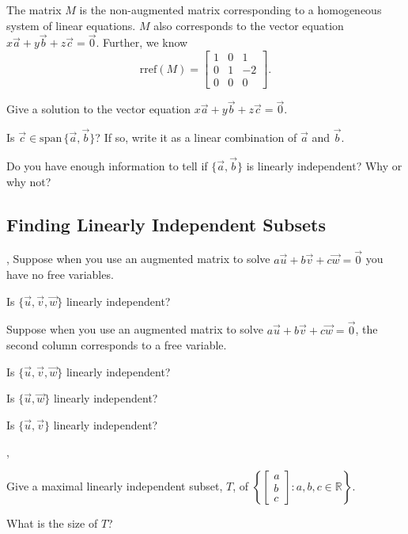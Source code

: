 \documentclass[letter]{article}
\newcommand{\R}{\mathbb{R}}
\newcommand{\Span}{\mathrm{span}\,}
\newcommand{\rref}{\mathrm{rref}}
\newcommand{\mat}[1]{\begin{bmatrix}#1\end{bmatrix}}
\renewcommand{\emph}[1]{{\color{defcolor} \textbf{\textit{##1}}}}
\begin{document}
	The matrix $M$ is the non-augmented matrix corresponding to a homogeneous system of linear equations.
	$M$ also corresponds to the vector equation $x\vec a+y\vec b+z\vec c=\vec 0$.  Further, we know
	\[
		\rref(M) = \mat{1&0&1\\0&1&-2\\0&0&0}.
	\]
	\begin{Enum}[resume]
		\item Give a solution to the vector equation $x\vec a+y\vec b+z\vec c=\vec 0$.
		\item Is $\vec c\in\Span\{\vec a,\vec b\}$?  If so, write it as a linear combination
			of $\vec a$ and $\vec b$.
		\item Do you have enough information to tell if $\{\vec a,\vec b\}$ is linearly independent?  Why or why not?
	\end{Enum}

\subsection*{Finding Linearly Independent Subsets}
	\sep
	Suppose when you use an augmented matrix to solve
	$a\vec u+b\vec v+c\vec w=\vec 0$ you have no free variables.
	
	\begin{Enum}
		\item Is $\{\vec u,\vec v,\vec w\}$ linearly independent?
	\end{Enum}
	
	Suppose when you use an augmented matrix to solve
	$a\vec u+b\vec v+c\vec w=\vec 0$, the second column corresponds to a 
	free variable.
	
	\begin{Enum}[resume]
		\item Is $\{\vec u,\vec v,\vec w\}$ linearly independent?
		\item Is $\{\vec u,\vec w\}$ linearly independent?
		\item Is $\{\vec u,\vec v\}$ linearly independent?
	\end{Enum}


	\sep
	\vspace{-.7cm}
	\begin{Enum}
		\item Give a maximal linearly independent subset, $T$, of
		$\left\{\mat{a\\b\\c}:a,b,c\in \R\right\}$.
		\item What is the size of $T$?
	\end{Enum}
\end{document}
